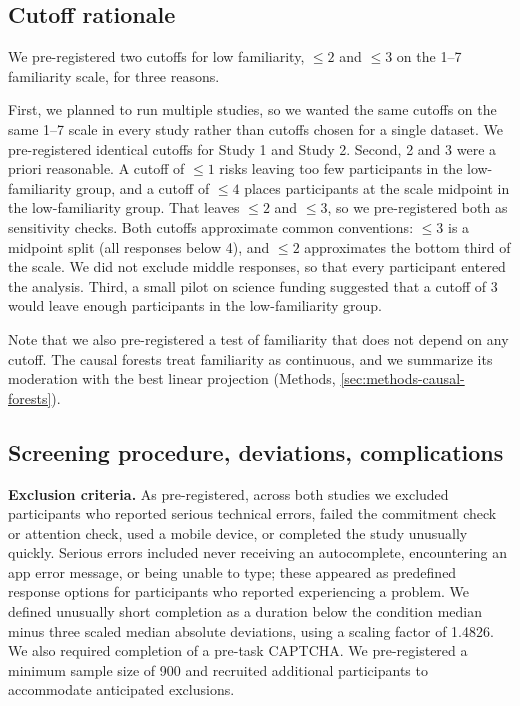 \documentclass[11pt]{article}
\begin{document}
\subsection{Cutoff rationale}
\label{sec:si-familiarity-cutoffs}
\label{sec:si-cutoff}

We pre-registered two cutoffs for low familiarity, $\leq 2$ and $\leq 3$ on the 1--7 familiarity scale, for three reasons.

First, we planned to run multiple studies, so we wanted the same cutoffs on the same 1--7 scale in every study rather than cutoffs chosen for a single dataset. We pre-registered identical cutoffs for Study 1 and Study 2. Second, 2 and 3 were a priori reasonable. A cutoff of $\leq 1$ risks leaving too few participants in the low-familiarity group, and a cutoff of $\leq 4$ places participants at the scale midpoint in the low-familiarity group. That leaves $\leq 2$ and $\leq 3$, so we pre-registered both as sensitivity checks. Both cutoffs approximate common conventions: $\leq 3$ is a midpoint split (all responses below 4), and $\leq 2$ approximates the bottom third of the scale. We did not exclude middle responses, so that every participant entered the analysis. Third, a small pilot on science funding suggested that a cutoff of 3 would leave enough participants in the low-familiarity group.

Note that we also pre-registered a test of familiarity that does not depend on any cutoff. The causal forests treat familiarity as continuous, and we summarize its moderation with the best linear projection (Methods, \autoref{sec:methods-causal-forests}).

\subsection{Screening procedure, deviations, complications}
\label{sec:si-screening}

\textbf{Exclusion criteria.} As pre-registered, across both studies we excluded participants who reported serious technical errors, failed the commitment check or attention check, used a mobile device, or completed the study unusually quickly. Serious errors included never receiving an autocomplete, encountering an app error message, or being unable to type; these appeared as predefined response options for participants who reported experiencing a problem. We defined unusually short completion as a duration below the condition median minus three scaled median absolute deviations, using a scaling factor of 1.4826. We also required completion of a pre-task CAPTCHA. We pre-registered a minimum sample size of 900 and recruited additional participants to accommodate anticipated exclusions.
\end{document}

